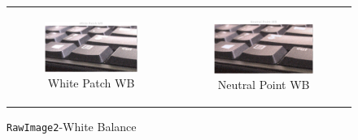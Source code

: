 \documentclass[11pt, a4]{article}
\begin{document}
\begin{enumerate}
\begin{figure}[H]
{\begin{tabular}{cc}
\begin{subfigure}[h]{0.45\linewidth}
							\centering
							\includegraphics[width=\linewidth]{../output/RawImage2_WB_3.pdf}
							\caption{White Patch WB}
							\label{fig:RawImage2_WB_3}
						\end{subfigure} &
						\begin{subfigure}[h]{0.45\linewidth}
							\centering
							\includegraphics[width=\linewidth]{../output/RawImage2_WB_4.pdf}
							\caption{Neutral Point WB}
							\label{fig:RawImage2_WB_4}
						\end{subfigure}
					\end{tabular}
				}
				\caption{\texttt{RawImage2}-White Balance}
				\label{fig:RawImage2_WB}
			\end{figure}   
			\begin{figure}[H]
				\centering
\end{figure}
\end{enumerate}
\end{document}
